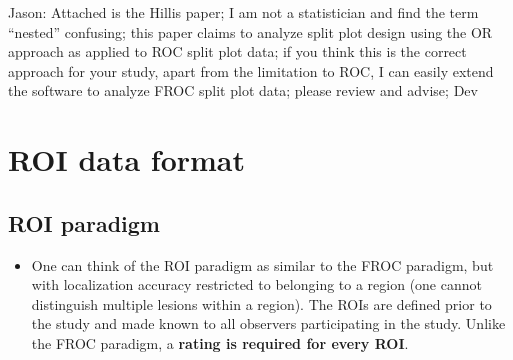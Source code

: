 \documentclass[]{book}
\providecommand{\tightlist}{%
  \setlength{\itemsep}{0pt}\setlength{\parskip}{0pt}}
\begin{document}
Jason: Attached is the Hillis paper; I am not a statistician and find the term ``nested'' confusing; this paper claims to analyze split plot design using the OR approach as applied to ROC split plot data; if you think this is the correct approach for your study, apart from the limitation to ROC, I can easily extend the software to analyze FROC split plot data; please review and advise; Dev

\hypertarget{roidataformat}{%
\chapter{ROI data format}\label{roidataformat}}

\hypertarget{roi-paradigm}{%
\section{ROI paradigm}\label{roi-paradigm}}

\begin{itemize}
\tightlist
\item
  One can think of the ROI paradigm as similar to the FROC paradigm, but with localization accuracy restricted to belonging to a region (one cannot distinguish multiple lesions within a region). The ROIs are defined prior to the study and made known to all observers participating in the study. Unlike the FROC paradigm, a \textbf{rating is required for every ROI}.
\end{itemize}


\end{document}
